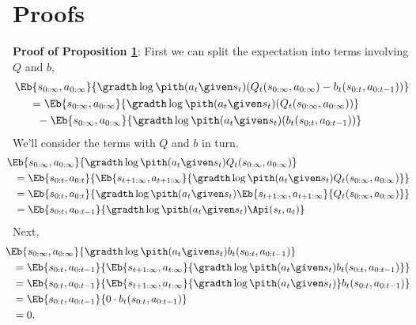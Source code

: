 \documentclass{article}
\newcommand{\bofpast}{b_t(s_{0:t},a_{0:t-1})}
\newcommand{\qofall}{Q_t(s_{0:\infty},a_{0:\infty})}
\begin{document}
\section{Proofs}\label{sec:proofs}
\textbf{Proof of Proposition \hyperlink{justprop}{1}}:
First we can split the expectation into terms involving $Q$ and $b$,
\begin{align}
&\Eb{s_{0:\infty},a_{0:\infty}}{\gradth \log \pith(a_t \given s_t) (\qofall-\bofpast)}  \nonumber\\
&\ \ \ \ = \Eb{s_{0:\infty},a_{0:\infty}}{\gradth \log \pith(a_t \given s_t) (\qofall)}\nonumber \\
&\ \ \ \ \ \ - \Eb{s_{0:\infty},a_{0:\infty}}{\gradth \log \pith(a_t \given s_t) (\bofpast)}
\end{align}
We'll consider the terms with $Q$ and $b$ in turn.
\begin{align*}
&\!\!\!\! \Eb{s_{0:\infty},a_{0:\infty}}{\gradth \log \pith(a_t \given s_t) \qofall} \\
&=\Eb{s_{0:t},a_{0:t}}{\Eb{s_{t+1:\infty},a_{t+1:\infty}}{\gradth \log \pith(a_t \given s_t) \qofall}}\\
&=\Eb{s_{0:t},a_{0:t}}{ \gradth \log \pith(a_t \given s_t) \Eb{s_{t+1:\infty},a_{t+1:\infty}}{\qofall}}\\
&=\Eb{s_{0:t},a_{0:t-1}}{ \gradth \log \pith(a_t \given s_t) \Api(s_t, a_t)}
\end{align*}
Next,
\begin{align*}
&\!\!\!\!\Eb{s_{0:\infty},a_{0:\infty}}{\gradth \log \pith(a_t \given s_t) \bofpast} \\
&=\Eb{s_{0:t},a_{0:t-1}}{\Eb{s_{t+1:\infty},a_{t:\infty}}{\gradth \log \pith(a_t \given s_t) \bofpast}}\\
&=\Eb{s_{0:t},a_{0:t-1}}{ \Eb{s_{t+1:\infty},a_{t:\infty}}{\gradth \log \pith(a_t \given s_t)}\bofpast}\\
&=\Eb{s_{0:t},a_{0:t-1}}{ 0 \cdot \bofpast}\\
&=0.
\end{align*}


{\small


}
\end{document}
